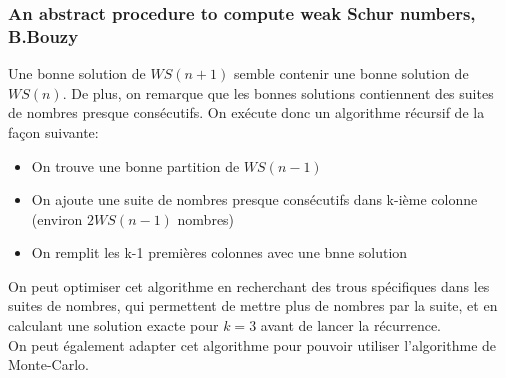 \documentclass{report}
\begin{document}
\subsubsection{An abstract procedure to compute weak Schur numbers, B.Bouzy}
Une bonne solution de $WS(n+1)$ semble contenir une bonne solution de $WS(n)$. De plus, on remarque que les bonnes solutions contiennent des suites de nombres presque consécutifs. On exécute donc un algorithme récursif de la façon suivante:
\begin{itemize}
    \item On trouve une bonne partition de $WS(n-1)$
    \item On ajoute une suite de nombres presque consécutifs dans k-ième colonne (environ $2WS(n-1)$ nombres)
    \item On remplit les k-1 premières colonnes avec une bnne solution
\end{itemize}
On peut optimiser cet algorithme en recherchant des trous spécifiques dans les suites de nombres, qui permettent de mettre plus de nombres par la suite, et en calculant une solution exacte pour $k=3$ avant de lancer la récurrence.
\\ On peut également adapter cet algorithme pour pouvoir utiliser l'algorithme de Monte-Carlo.
\end{document}
